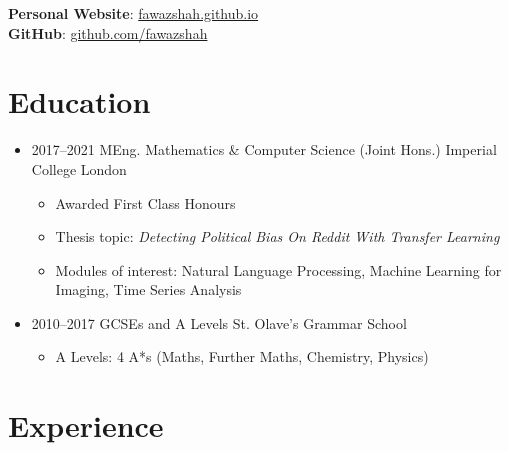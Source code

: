 \documentclass[11pt,a4paper,sans]{moderncv}        %
\begin{document}
\maketitle

\vspace{-40pt}

\begin{center}
\textbf{Personal Website}: \href{https://fawazshah.github.io/}{fawazshah.github.io} \\
\textbf{GitHub}: \href{https://github.com/fawazshah/}{github.com/fawazshah}
\end{center}

\section{Education}

\begin{itemize}

\item{
\cventry
{2017--2021}
{MEng. Mathematics \& Computer Science (Joint Hons.)}
{Imperial College London}
{}{}{
\begin{itemize}
\item Awarded First Class Honours
\item Thesis topic: \textit{Detecting Political Bias On Reddit With Transfer Learning}
\item Modules of interest: Natural Language Processing, Machine Learning for Imaging, Time Series Analysis
\end{itemize}
}} %

\item{
\cventry
{2010--2017}
{GCSEs and A Levels}
{St. Olave's Grammar School}
{}{}{
\begin{itemize}
\item A Levels: 4 A*s (Maths, Further Maths, Chemistry, Physics)
\end{itemize}
}}

\end{itemize}

\vspace{-10pt}

\section{Experience}
\end{document}
